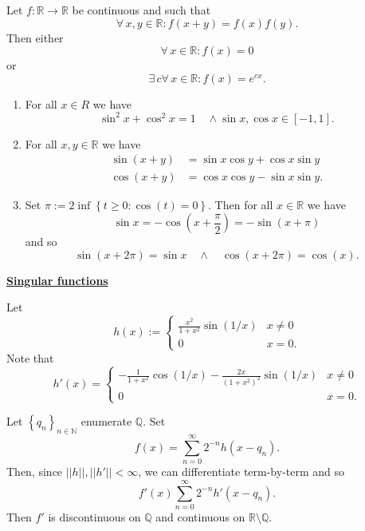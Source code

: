 \documentclass{notes}
\begin{document}
  \begin{lem}
    Let $f \colon \mathbb R \to \mathbb R$ be continuous and such that 
    \[
      \forall \, x, y \in \mathbb R: f(x + y) = f(x) f(y).
    \]
    Then either
    \[
      \forall \, x \in \mathbb R: f(x) = 0
    \]
    or 
    \[
      \exists \, c \forall \, x \in \mathbb R: f(x) = e^{c x}.
    \]
  \end{lem}
  
  \newpage
  
  \begin{lem}
    \begin{enumerate}
      \item For all $x \in R$ we have
      \[
        \sin^2 x + \cos^2 x = 1 \quad \land \sin x, \cos x \in [-1, 1].
      \]

      \item For all $x, y \in \mathbb R$ we have 
      \begin{align*}
        \sin(x + y) &= \sin x \cos y + \cos x \sin y \\ 
        \cos(x + y) &= \cos x \cos y - \sin x \sin y.
      \end{align*}
      
      \item Set $\pi := 2 \inf \left \{ t \geq 0 : \cos(t) = 0 \right \}$.
      Then for all $x \in \mathbb R$ we have 
      \[
        \sin x = -\cos \left ( x + \frac{\pi}{2} \right ) = -\sin(x + \pi)
      \]
      and so 
      \[
        \sin(x + 2 \pi) = \sin x \quad \land \quad \cos(x + 2 \pi) = \cos(x).
      \]
    \end{enumerate}
  \end{lem}
  
  {\boldmath \bfseries \underline{Singular functions}}
  
  Let 
  \[
    h(x) := \begin{cases}
      \frac{x^2}{1 + x^2} \sin(1 / x) & x \neq 0 \\ 
      0 & x = 0.
    \end{cases}
  \]
  Note that 
  \[
    h'(x) = \begin{cases}
      -\frac{1}{1 + x^2} \cos(1 / x) - \frac{2 x}{(1 + x^2)^2} \sin(1 / x) & x \neq 0 \\ 
      0 & x = 0.
    \end{cases}
  \]
  
  Let $\left \{ q_n \right \}_{n \in \mathbb N}$ enumerate $\mathbb Q$.
  Set 
  \[
    f(x) = \sum_{n = 0}^\infty 2^{-n} h(x - q_n).
  \]
  Then, since $||h||, ||h'|| < \infty$, we can differentiate term-by-term and so 
  \[
    f'(x) \sum_{n = 0}^\infty 2^{-n} h'(x - q_n).
  \]
  Then $f'$ is discontinuous on $\mathbb Q$ and continuous on $\mathbb R \setminus \mathbb Q$.
  
\end{document}
